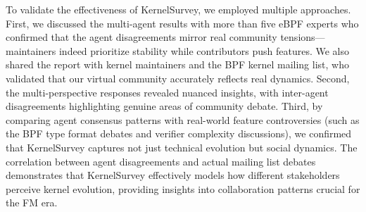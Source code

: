 To validate the effectiveness of KernelSurvey, we employed multiple approaches. First, we discussed the multi-agent results with more than five eBPF experts who confirmed that the agent disagreements mirror real community tensions—maintainers indeed prioritize stability while contributors push features. We also shared the report with kernel maintainers and the BPF kernel mailing list, who validated that our virtual community accurately reflects real dynamics. Second, the multi-perspective responses revealed nuanced insights, with inter-agent disagreements highlighting genuine areas of community debate. Third, by comparing agent consensus patterns with real-world feature controversies (such as the BPF type format debates and verifier complexity discussions), we confirmed that KernelSurvey captures not just technical evolution but social dynamics. The correlation between agent disagreements and actual mailing list debates demonstrates that KernelSurvey effectively models how different stakeholders perceive kernel evolution, providing insights into collaboration patterns crucial for the FM era.

% 
% 